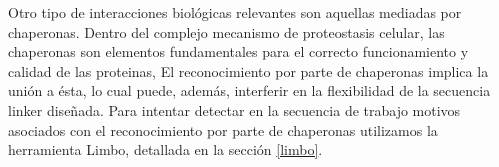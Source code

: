 Otro tipo de interacciones biológicas relevantes son aquellas mediadas por chaperonas.
Dentro del complejo mecanismo de proteostasis celular, las chaperonas son elementos fundamentales para el correcto funcionamiento y calidad de las proteinas, 
El reconocimiento por parte de chaperonas implica la unión a ésta, lo cual puede, además, interferir en la flexibilidad de la secuencia linker diseñada.
Para intentar detectar en la secuencia de trabajo motivos asociados con el reconocimiento por parte de chaperonas utilizamos la herramienta Limbo, detallada en la sección \ref{limbo}. 


% 























